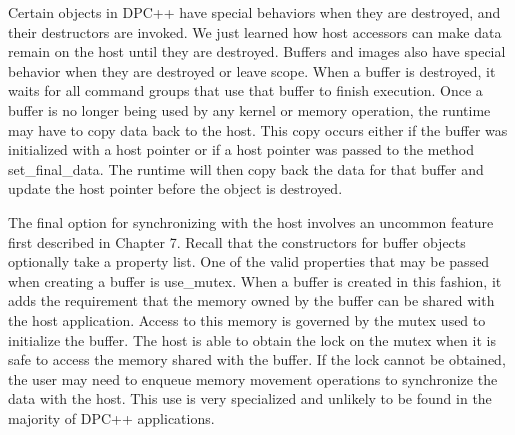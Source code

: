 Certain objects in DPC++ have special behaviors when they are destroyed, and their destructors are invoked. We just learned how host accessors can make data remain on the host until they are destroyed. Buffers and images also have special behavior when they are destroyed or leave scope. When a buffer is destroyed, it waits for all command groups that use that buffer to finish execution. Once a buffer is no longer being used by any kernel or memory operation, the runtime may have to copy data back to the host. This copy occurs either if the buffer was initialized with a host pointer or if a host pointer was passed to the method set\_final\_data. The runtime will then copy back the data for that buffer and update the host pointer before the object is destroyed.\par

The final option for synchronizing with the host involves an uncommon feature first described in Chapter 7. Recall that the constructors for buffer objects optionally take a property list. One of the valid properties that may be passed when creating a buffer is use\_mutex. When a buffer is created in this fashion, it adds the requirement that the memory owned by the buffer can be shared with the host application. Access to this memory is governed by the mutex used to initialize the buffer. The host is able to obtain the lock on the mutex when it is safe to access the memory shared with the buffer. If the lock cannot be obtained, the user may need to enqueue memory movement operations to synchronize the data with the host. This use is very specialized and unlikely to be found in the majority of DPC++ applications.\par

